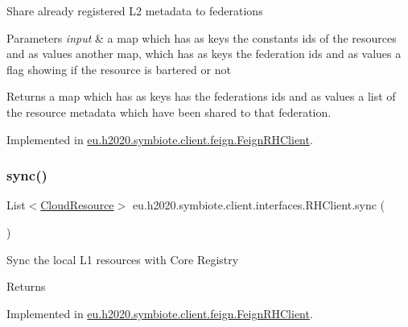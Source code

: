 Share already registered L2 metadata to federations


\begin{DoxyParams}{Parameters}
{\em input} & a map which has as keys the constants ids of the resources and as values another map, which has as keys the federation ids and as values a flag showing if the resource is bartered or not \\
\hline
\end{DoxyParams}
\begin{DoxyReturn}{Returns}
a map which has as keys has the federations ids and as values a list of the resource metadata which have been shared to that federation. 
\end{DoxyReturn}


Implemented in \hyperlink{classeu_1_1h2020_1_1symbiote_1_1client_1_1feign_1_1FeignRHClient_a2ad028004364f0068c760134a25956b0}{eu.\+h2020.\+symbiote.\+client.\+feign.\+Feign\+R\+H\+Client}.

\mbox{\label{interfaceeu_1_1h2020_1_1symbiote_1_1client_1_1interfaces_1_1RHClient_ae450ac97070e6968eb9d1bfcfd3ae3e6}} 
\subsubsection{\texorpdfstring{sync()}{sync()}}
{\footnotesize\ttfamily List$<$\hyperlink{classeu_1_1h2020_1_1symbiote_1_1cloud_1_1model_1_1internal_1_1CloudResource}{Cloud\+Resource}$>$ eu.\+h2020.\+symbiote.\+client.\+interfaces.\+R\+H\+Client.\+sync (\begin{DoxyParamCaption}{ }\end{DoxyParamCaption})}

Sync the local L1 resources with Core Registry

\begin{DoxyReturn}{Returns}

\end{DoxyReturn}


Implemented in \hyperlink{classeu_1_1h2020_1_1symbiote_1_1client_1_1feign_1_1FeignRHClient_a8181d6656e2c7dea2d01bc5ee16e8639}{eu.\+h2020.\+symbiote.\+client.\+feign.\+Feign\+R\+H\+Client}.


